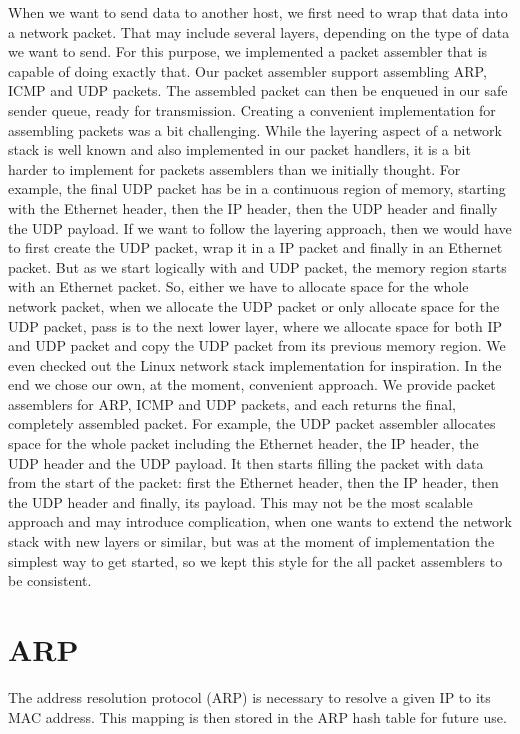 When we want to send data to another host, we first need to wrap that data into
a network packet. That may include several layers, depending on the type of data
we want to send. For this purpose, we implemented a packet assembler that is
capable of doing exactly that. Our packet assembler support assembling ARP, ICMP
and UDP packets. The assembled packet can then be enqueued in our safe sender
queue, ready for transmission.  Creating a convenient implementation for
assembling packets was a bit challenging. While the layering aspect of a network
stack is well known and also implemented in our packet handlers, it is a bit
harder to implement for packets assemblers than we initially thought. For
example, the final UDP packet has be in a continuous region of memory, starting
with the Ethernet header, then the IP header, then the UDP header and finally
the UDP payload.  If we want to follow the layering approach, then we would have
to first create the UDP packet, wrap it in a IP packet and finally in an
Ethernet packet. But as we start logically with and UDP packet, the memory
region starts with an Ethernet packet. So, either we have to allocate space for
the whole network packet, when we allocate the UDP packet or only allocate space
for the UDP packet, pass is to the next lower layer, where we allocate space for
both IP and UDP packet and copy the UDP packet from its previous memory region.
We even checked out the Linux network stack implementation for inspiration.  In
the end we chose our own, at the moment, convenient approach.  We provide packet
assemblers for ARP, ICMP and UDP packets, and each returns the final, completely
assembled packet. For example, the UDP packet assembler allocates space for the
whole packet including the Ethernet header, the IP header, the UDP header and
the UDP payload. It then starts filling the packet with data from the start of
the packet: first the Ethernet header, then the IP header, then the UDP header
and finally, its payload. This may not be the most scalable approach and may
introduce complication, when one wants to extend the network stack with new
layers or similar, but was at the moment of implementation the simplest way to
get started, so we kept this style for the all packet assemblers to be
consistent.

\section{ARP}

The address resolution protocol (ARP) is necessary to resolve a given IP to its
MAC address. This mapping is then stored in the ARP hash table for future use.

